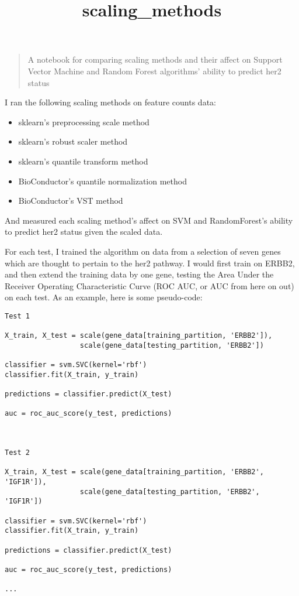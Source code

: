\documentclass[11pt]{article}
\title{scaling\_methods}
\providecommand{\tightlist}{%
      \setlength{\itemsep}{0pt}\setlength{\parskip}{0pt}}
\begin{document}
    
    
    \maketitle
    
    

    
    \begin{quote}
A notebook for comparing scaling methods and their affect on Support
Vector Machine and Random Forest algorithms' ability to predict her2
status
\end{quote}

    I ran the following scaling methods on feature counts data:

\begin{itemize}
\tightlist
\item
  sklearn's preprocessing scale method
\item
  sklearn's robust scaler method
\item
  sklearn's quantile transform method
\item
  BioConductor's quantile normalization method
\item
  BioConductor's VST method
\end{itemize}

And measured each scaling method's affect on SVM and RandomForest's
ability to predict her2 status given the scaled data.

For each test, I trained the algorithm on data from a selection of seven
genes which are thought to pertain to the her2 pathway. I would first
train on ERBB2, and then extend the training data by one gene, testing
the Area Under the Receiver Operating Characteristic Curve (ROC AUC, or
AUC from here on out) on each test. As an example, here is some
pseudo-code:

\begin{verbatim}
Test 1

X_train, X_test = scale(gene_data[training_partition, 'ERBB2']), 
                  scale(gene_data[testing_partition, 'ERBB2'])

classifier = svm.SVC(kernel='rbf')
classifier.fit(X_train, y_train)

predictions = classifier.predict(X_test)

auc = roc_auc_score(y_test, predictions)



Test 2

X_train, X_test = scale(gene_data[training_partition, 'ERBB2', 'IGF1R']), 
                  scale(gene_data[testing_partition, 'ERBB2', 'IGF1R'])

classifier = svm.SVC(kernel='rbf')
classifier.fit(X_train, y_train)

predictions = classifier.predict(X_test)

auc = roc_auc_score(y_test, predictions)

...
\end{verbatim}
\end{document}
